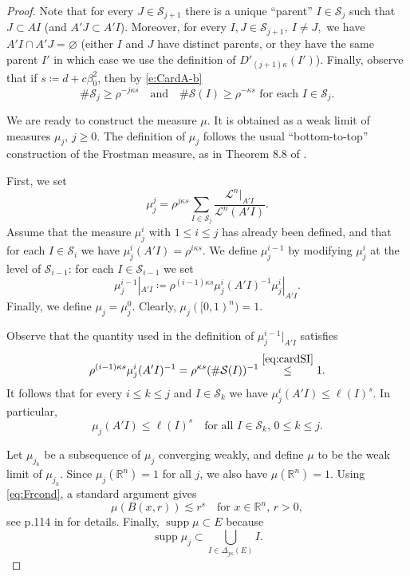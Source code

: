 \documentclass[11pt,reqno]{amsart}
\def\dS{{\mathcal{S}}}
\newcommand{\fr}[2]{\frac{#1}{#2}}
\theoremstyle{definition}
\theoremstyle{remark}
\numberwithin{equation}{section}
\newcommand{\R}{\mathbb{R}}
\DeclareMathOperator{\supp}{supp}
\theoremstyle{theorem}
\theoremstyle{definition}
\theoremstyle{remark}
\numberwithin{equation}{section}
\begin{document}
\begin{proof}
	Note that for every $J\in\dS_{j+1}$ there is a unique ``parent'' $I\in\dS_j$ such that $J\subset AI$ (and $A'J\subset A'I$). Moreover, for every $I,J\in\dS_{j+1},\ I\neq J, $ we have $A'I\cap A'J=\varnothing$ (either $I$ and $J$ have distinct parents, or they have the same parent $I'$ in which case we use the definition of $D'_{(j+1)\kappa}(I')$). Finally, observe that if $s\coloneqq d+c\beta_0^2$, then by \eqref{e:CardA-b}
	\begin{equation}\label{eq:cardSI}
	\#\dS_j\ge \rho^{-j\kappa s}\quad\text{and}\quad \#\dS(I)\ge \rho^{-\kappa s} \text{ for each $I\in\dS_j$}.
	\end{equation}
	
%
	
%
%
%
%
%
%
%
%
%
%
%
%
%
%
%
%
%
%
%
	We are ready to construct the measure $\mu$. It is obtained as a weak limit of measures $\mu_j,\, j\ge0$. The definition of $\mu_j$ follows the usual ``bottom-to-top'' construction of the Frostman measure, as in Theorem 8.8 of \cite{mattila}.
	
	 First, we set
	\begin{equation*}
	\mu_j^j = \rho^{j\kappa s}\sum_{I\in \dS_j}\fr{\mathcal{L}^n|_{A'I}}{\mathcal{L}^n(A'I)}.
	\end{equation*}
	Assume that the measure $\mu_j^i$ with $1\le i\le j$ has already been defined, and that for each $I\in\dS_i$ we have $\mu_j^i(A'I)= \rho^{i\kappa s}$. We define $\mu_j^{i-1}$ by modifying $\mu_j^i$ at the level of $\dS_{i-1}$: for each $I\in \dS_{i-1}$ we set
%
%
%
%
%
%
	\begin{equation*}
	\mu_j^{i-1}|_{A'I} \coloneqq \rho^{(i-1)\kappa s}  \mu_j^{i}(A'I)^{-1} \mu_j^{i}|_{A'I} .
	\end{equation*}
	Finally, we define $\mu_j=\mu_j^0$. Clearly, $\mu_j([0,1)^n)=1$.
	
	Observe that the quantity used in the definition of $\mu_j^{i-1}|_{A'I}$ satisfies
	\begin{equation*}
	\rho^{(i-1)\kappa s}  \mu_j^{i}(A'I)^{-1} = \rho^{\kappa s}  (\#\dS(I))^{-1} \overset{\eqref{eq:cardSI}}{\le }1.
	\end{equation*}
	It follows that for every $i\le k\le j$ and $I\in\dS_k$ we have
$
	\mu_j^i(A'I)\le \ell(I)^s.
$
	In particular,
	\begin{equation}\label{eq:Frcond}
	\mu_j(A'I)\le \ell(I)^s\quad \text{for all $I\in\dS_k,\, 0\le k\le j$.}
	\end{equation} 
	
	Let $\mu_{j_k}$ be a subsequence of $\mu_j$ converging weakly, and define $\mu$ to be the weak limit of $\mu_{j_k}$. Since $\mu_j(\R^n)=1$ for all $j$, we also have $\mu(\R^n)=1$. Using \eqref{eq:Frcond}, a standard argument gives
	\begin{equation*}
	\mu(B(x,r))\lesssim r^s\quad\text{for $x\in\R^n,\,r>0$},
	\end{equation*}
	see p.114 in \cite{mattila} for details. Finally, $\supp\mu\subset E$ because
	\begin{equation*}
	\supp\mu_j\subset \bigcup_{I\in\Delta_{j\kappa}(E)}I.
	\end{equation*}	
	\end{proof}
\end{document}
